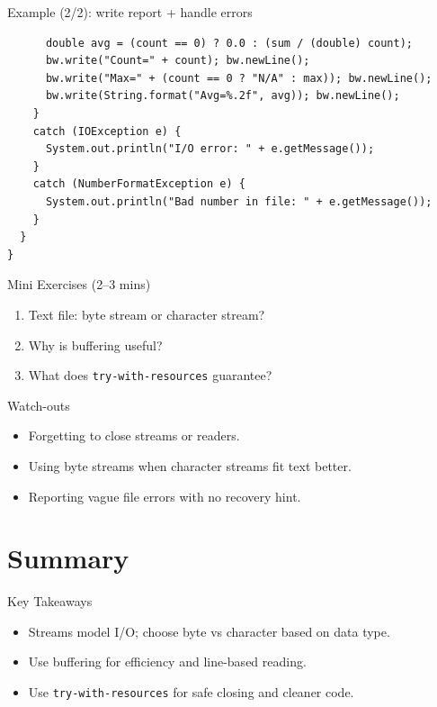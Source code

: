 \documentclass{beamer}
\begin{document}
\begin{frame}[fragile,shrink=8]{Example (2/2): write report + handle errors}
\begin{lstlisting}
      double avg = (count == 0) ? 0.0 : (sum / (double) count);
      bw.write("Count=" + count); bw.newLine();
      bw.write("Max=" + (count == 0 ? "N/A" : max)); bw.newLine();
      bw.write(String.format("Avg=%.2f", avg)); bw.newLine();
    }
    catch (IOException e) {
      System.out.println("I/O error: " + e.getMessage());
    }
    catch (NumberFormatException e) {
      System.out.println("Bad number in file: " + e.getMessage());
    }
  }
}
\end{lstlisting}
  \slidesources{\OOPSUnitIIISources}
\end{frame}

\begin{frame}{Mini Exercises (2--3 mins)}
  \begin{enumerate}[<+->]
    \item Text file: byte stream or character stream?
    \item Why is buffering useful?
    \item What does \texttt{try-with-resources} guarantee?
  \end{enumerate}
  \slidesources{\OOPSUnitIIISources}
\end{frame}

\begin{frame}{Watch-outs}
\begin{itemize}[<+->]
  \item Forgetting to close streams or readers.
  \item Using byte streams when character streams fit text better.
  \item Reporting vague file errors with no recovery hint.
\end{itemize}
  \slidesources{\OOPSUnitIIISources}
\end{frame}

\section{Summary}
\label{sec:summary}

\begin{frame}{Key Takeaways}
  \begin{itemize}[<+->]
    \item Streams model I/O; choose byte vs character based on data type.
    \item Use buffering for efficiency and line-based reading.
    \item Use \texttt{try-with-resources} for safe closing and cleaner code.
  \end{itemize}
  \slidesources{\OOPSUnitIIISources}
\end{frame}
\end{document}
